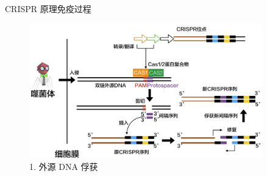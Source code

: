 \documentclass{beamer}
\begin{document}
\begin{frame}{CRISPR 原理}{免疫过程}
		
	\begin{figure}
		\centering
		\includegraphics[width=0.9\textwidth]{img/infect_stage1.jpeg}
		\caption{1. 外源 DNA 俘获}
	\end{figure}






\end{frame}

\end{document}
